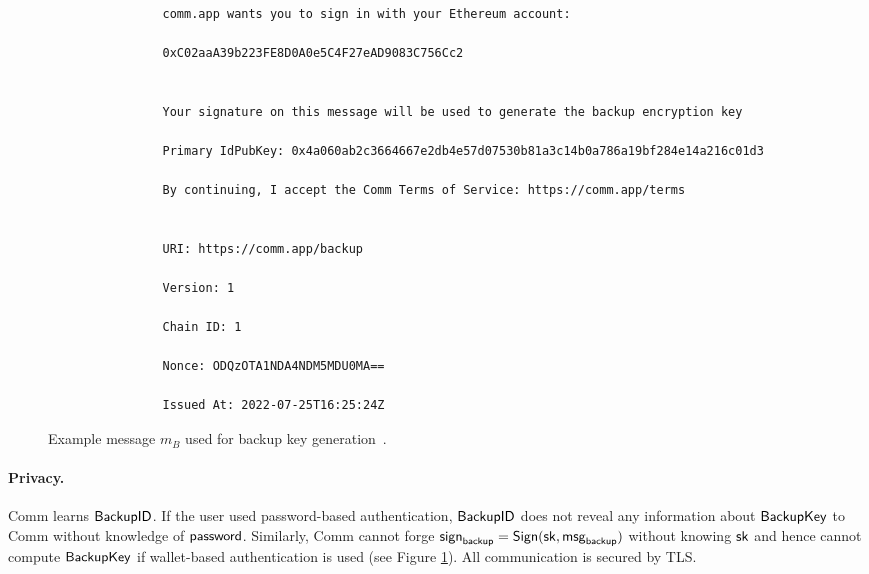 \documentclass{article}
\newcommand{\sk}{{\sf sk}}
\newcommand{\pw}{{\sf password}}
\newcommand{\signbackup}{{\sf sign}_{\sf backup}}
\newcommand{\msgbackup}{{\sf msg}_{\sf backup}}
\newcommand{\bk}{{\sf BackupKey}}
\newcommand{\bid}{\sf BackupID}
\newcommand{\sign}{\sf Sign}
\begin{document}
\begin{figure}[htb!]
    \centering
        \begin{Verbatim}[frame=single]
        
                comm.app wants you to sign in with your Ethereum account:
                
                0xC02aaA39b223FE8D0A0e5C4F27eAD9083C756Cc2


                Your signature on this message will be used to generate the backup encryption key
                
                Primary IdPubKey: 0x4a060ab2c3664667e2db4e57d07530b81a3c14b0a786a19bf284e14a216c01d3
                
                By continuing, I accept the Comm Terms of Service: https://comm.app/terms


                URI: https://comm.app/backup
                
                Version: 1

                Chain ID: 1

                Nonce: ODQzOTA1NDA4NDM5MDU0MA==

                Issued At: 2022-07-25T16:25:24Z

        \end{Verbatim}

    \caption{Example message $m_B$ used for backup key generation~\cite{siwe}.}
    \label{fig:backupmessage}
\end{figure}





\paragraph{Privacy.} Comm learns $\bid$. If the user used password-based authentication, $\bid$ does not reveal any information about $\bk$ to Comm without knowledge of $\pw$. Similarly, Comm cannot forge $\signbackup = \sign(\sk, \msgbackup)$ without knowing $\sk$ and hence cannot compute $\bk$ if wallet-based authentication is used (see Figure \ref{fig:backupmessage}). All communication is secured by TLS.





\end{document}
